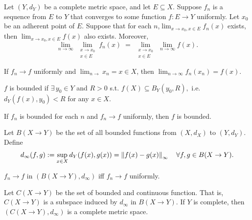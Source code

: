\documentclass[12pt]{article}
\begin{document}
\begin{theorem}
    Let $(Y,d_Y)$ be a complete metric space, and let $E\subseteq X$.
    Suppose $f_n$ is a sequence from $E$ to $Y$ that converges to some function $f:E\rightarrow Y$ uniformly.
    Let $x_0$ be an adherent point of $E$.
    Suppose that for each $n$,$\lim_{x\rightarrow x_0, x\in E}f_n(x)$ exists,
    then $\lim_{x\rightarrow x_0, x\in E}f(x)$ also exists. Moreover, 
    \[
\lim_{n\to\infty}\,\lim_{\substack{x\to x_0\\x\in E}} f_n(x)
\;=\;
\lim_{\substack{x\to x_0\\x\in E}}\,\lim_{n\to\infty} f(x).
\]
\end{theorem}

\begin{theorem}
    If $f_n\rightarrow f$ uniformly and $\lim_{n\rightarrow}x_n=x\in X$, then $\lim_{n\rightarrow\infty}f_n(x_n)=f(x).$ 
\end{theorem}

\begin{definition}
    $f$ is bounded if $\exists\, y_0\in Y$ and $R>0$ s.t. $f(X)\subseteq B_Y(y_0,R),$ i.e. $d_Y(f(x), y_0)<R$ for any $x\in X$.
\end{definition}

\begin{theorem}
    If $f_n$ is bounded for each $n$ and $f_n\rightarrow f$ uniformly, then $f$ is bounded.
\end{theorem}


\begin{definition}
    Let $B(X\rightarrow Y)$ be the set of all bounded functions from $(X,d_X)$ to $(Y,d_Y)$.
    Define 
    \[
    d_{\infty}(f,g) := \sup_{x\in X} d_Y(f(x), g(x))=\left\lVert f(x)-g(x) \right\rVert_{\infty}\quad \forall f,g\in B(X\rightarrow Y).
    \]
\end{definition}

\begin{theorem}
    $f_n\rightarrow f$ in $(B(X\rightarrow Y),d_{\infty})$ iff $f_n\rightarrow f$ uniformly.
\end{theorem}

\begin{theorem}
Let $C(X\rightarrow Y)$ be the set of bounded and continuous function. That is, $C(X\rightarrow Y)$ is a subspace induced by $d_\infty$ in $B(X\rightarrow Y)$.
If $Y$ is complete, then $(C(X\rightarrow Y),d_\infty)$ is a complete metric space.  
\end{theorem}
\end{document}
